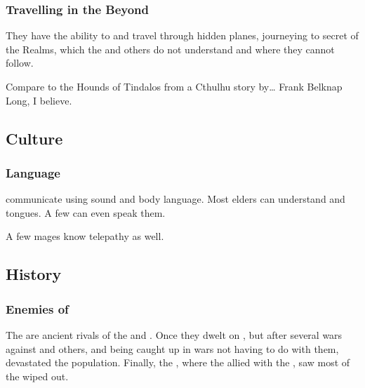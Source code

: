 \subsubsection{Travelling in the Beyond}
They have the ability to  and travel through hidden planes, journeying to secret  of the Realms, which the \dragons{} and others do not understand and where they cannot follow. 

Compare to the Hounds of Tindalos from a Cthulhu story by\ldots{} Frank Belknap Long, I believe. 









\subsection{Culture}





\subsubsection{Language}
\Vorcanths{} communicate using sound and body language. 
Most elders can understand \draconic{} and \resphan{} tongues. 
A few can even speak them. 

A few mages know telepathy as well. 









\subsection{History}





\subsubsection{Enemies of \dragons}
The \vorcanths{} are ancient rivals of the \dragons{} and \ophidians. 
Once they dwelt on \Tembrae{}, but after several wars against \dragons{} and others, and being caught up in wars not having to do with them, devastated the \vorcanth{} population. 
Finally, the \secondbanewar, where the \vorcanths{} allied with the \resphain, saw most of the wiped out. 

